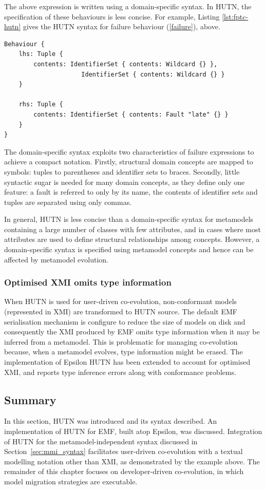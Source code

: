 The above expression is written using a domain-specific syntax. In HUTN, the specification of these behaviours is less concise. For example, Listing \ref{lst:fptc-hutn} gives the HUTN syntax for failure behaviour (\ref{failure}), above.

\begin{lstlisting}[caption=Failure behaviour specified in HUTN., label=lst:fptc-hutn, language=FPTC]
Behaviour {
    lhs: Tuple {
        contents: IdentifierSet { contents: Wildcard {} },
                     IdentifierSet { contents: Wildcard {} }
    }

    rhs: Tuple {
        contents: IdentifierSet { contents: Fault "late" {} }
    }
}
\end{lstlisting}

The domain-specific syntax exploits two characteristics of failure expressions to achieve a compact notation. Firstly, structural domain concepts are mapped to symbols: tuples to parentheses and identifier sets to braces. Secondly, little syntactic sugar is needed for many domain concepts, as they define only one feature: a fault is referred to only by its name, the contents of identifier sets and tuples are separated using only commas.

In general, HUTN is less concise than a domain-specific syntax for metamodels containing a large number of classes with few attributes, and in cases where most attributes are used to define structural relationships among concepts. However, a domain-specific syntax is specified using metamodel concepts and hence can be affected by metamodel evolution.

\subsubsection{Optimised XMI omits type information}
When HUTN is used for user-driven co-evolution, non-conformant models (represented in XMI) are transformed to HUTN source. The default EMF serialisation mechanism is configure to reduce the size of models on disk and consequently the XMI produced by EMF omits type information when it may be inferred from a metamodel. This is problematic for managing co-evolution because, when a metamodel evolves, type information might be erased. The implementation of Epsilon HUTN has been extended to account for optimised XMI, and reports type inference errors along with conformance problems. 

\subsection{Summary}
In this section, HUTN was introduced and its syntax described. An implementation of HUTN for EMF, built atop Epsilon, was discussed. Integration of HUTN for the metamodel-independent syntax discussed in Section~\ref{sec:mmi_syntax} facilitates user-driven co-evolution with a textual modelling notation other than XMI, as demonstrated by the example above. The remainder of this chapter focuses on developer-driven co-evolution, in which model migration strategies are executable.